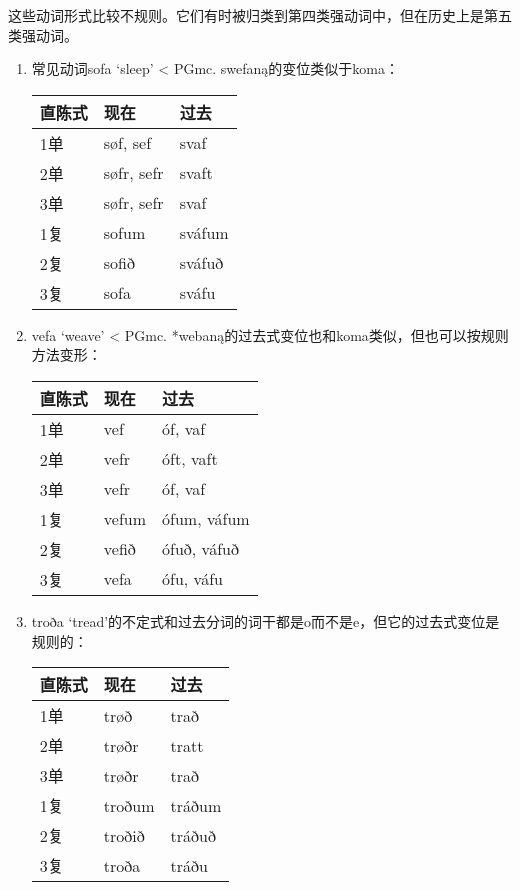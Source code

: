 这些动词形式比较不规则。它们有时被归类到第四类强动词中，但在历史上是第五类强动词。

\begin{enumerate}
    \item
          常见动词sofa `sleep‌' < PGmc. swefaną的变位类似于koma：

          \begin{longtable}{lll}
              \toprule
              直陈式 & 现在       & 过去   \\
              \midrule
              \endhead
              \bottomrule
              \endfoot
              1单    & søf, sef   & svaf   \\
              2单    & søfr, sefr & svaft  \\
              3单    & søfr, sefr & svaf   \\
              1复    & sofum      & sváfum \\
              2复    & sofið      & sváfuð \\
              3复    & sofa       & sváfu  \\
          \end{longtable}

    \item
          vefa `weave' < PGmc. *webaną的过去式变位也和koma类似，但也可以按规则方法变形：

          \begin{longtable}{lll}
              \toprule
              直陈式 & 现在  & 过去        \\
              \midrule
              \endhead
              \bottomrule
              \endfoot
              1单    & vef   & óf, vaf     \\
              2单    & vefr  & óft, vaft   \\
              3单    & vefr  & óf, vaf     \\
              1复    & vefum & ófum, váfum \\
              2复    & vefið & ófuð, váfuð \\
              3复    & vefa  & ófu, váfu   \\
          \end{longtable}
    \item
          troða
          `tread‌'的不定式和过去分词的词干都是o而不是e，但它的过去式变位是规则的：

          \begin{longtable}{lll}
              \toprule
              直陈式 & 现在   & 过去   \\
              \midrule
              \endhead
              \bottomrule
              \endfoot
              1单    & trøð   & trað   \\
              2单    & trøðr  & tratt  \\
              3单    & trøðr  & trað   \\
              1复    & troðum & tráðum \\
              2复    & troðið & tráðuð \\
              3复    & troða  & tráðu  \\
          \end{longtable}


\end{enumerate}
